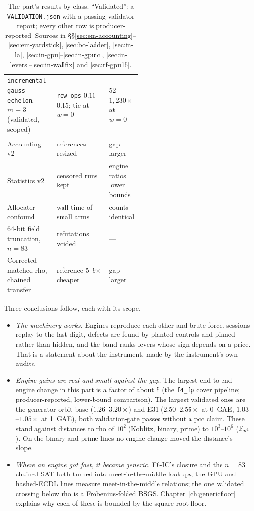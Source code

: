 \begin{table}[t]
\begin{tabularx}{\linewidth}{@{}>{\raggedright}p{0.32\linewidth}>{\raggedright}X>{\raggedright\arraybackslash}p{0.22\linewidth}@{}}
\texttt{incremental-gauss-echelon}, $m=3$ (validated, scoped) & \texttt{row\_ops} $0.10$--$0.15$; tie at $w=0$ & $52$--$1{,}230\times$ at $w=0$ \\
\addlinespace
\multicolumn{3}{@{}l}{\emph{Accounting and instrument changes}} \\
Accounting v2 & references resized & gap larger \\
Statistics v2 & censored runs kept & engine ratios lower bounds \\
Allocator confound & wall time of small arms & counts identical \\
64-bit field truncation, $n=83$ & refutations voided & --- \\
Corrected matched rho, chained transfer & reference 5--9$\times$ cheaper & gap larger \\
\bottomrule
\end{tabularx}
\caption[]{The part's results by class. ``Validated'': a \texttt{VALIDATION.json}
with a passing validator report; every other row is producer-reported.
Sources in \S\S\ref{sec:em-accounting}--\ref{sec:em-yardstick},
\ref{sec:bo-ladder}, \ref{sec:in-la}, \ref{sec:in-gpu}--\ref{sec:in-gpuic},
\ref{sec:in-levers}--\ref{sec:in-wallfix} and \ref{sec:rf-gpu15}.}
\label{tab:in-summary}
\end{table}

Three conclusions follow, each with its scope.
\begin{itemize}
\item \emph{The machinery works.} Engines reproduce each other and brute
  force, sessions replay to the last digit, defects are found by planted
  controls and pinned rather than hidden, and the band ranks levers whose
  sign depends on a price. That is a statement about the instrument, made
  by the instrument's own audits.
\item \emph{Engine gains are real and small against the gap.} The largest
  end-to-end engine change in this part is a factor of about 5 (the
  \texttt{f4\_fp} cover pipeline; producer-reported, lower-bound
  comparison). The largest validated ones are the generator-orbit base
  ($1.26$--$3.20\times$) and E31 ($2.50$--$2.56\times$ at 0~GAE,
  $1.03$--$1.05\times$ at 1~GAE), both validation-gate passes without a pcc
  claim. These stand against distances to rho of $10^2$ (Koblitz, binary, prime) to $10^3$--$10^6$
  ($\mathbb{F}_{p^4}$). On the binary and prime lines no engine change moved the
  distance's slope.
\item \emph{Where an engine got fast, it became generic.} F6-IC's closure
  and the $n=83$ chained SAT both turned into meet-in-the-middle lookups; the
  GPU and hashed-ECDL lines measure meet-in-the-middle relations; the one
  validated crossing below rho is a Frobenius-folded BSGS. Chapter~\ref{ch:genericfloor}
  explains why each of these is bounded by the square-root floor.
\end{itemize}
